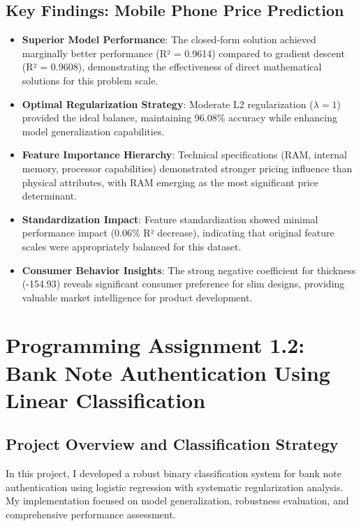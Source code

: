 \documentclass[12pt,a4paper]{article}
\begin{document}
\subsection{Key Findings: Mobile Phone Price Prediction}
\begin{itemize}
\item \textbf{Superior Model Performance}: The closed-form solution achieved marginally better performance (R² = 0.9614) compared to gradient descent (R² = 0.9608), demonstrating the effectiveness of direct mathematical solutions for this problem scale.

\item \textbf{Optimal Regularization Strategy}: Moderate L2 regularization ($\lambda=1$) provided the ideal balance, maintaining 96.08\% accuracy while enhancing model generalization capabilities.

\item \textbf{Feature Importance Hierarchy}: Technical specifications (RAM, internal memory, processor capabilities) demonstrated stronger pricing influence than physical attributes, with RAM emerging as the most significant price determinant.

\item \textbf{Standardization Impact}: Feature standardization showed minimal performance impact (0.06\% R² decrease), indicating that original feature scales were appropriately balanced for this dataset.

\item \textbf{Consumer Behavior Insights}: The strong negative coefficient for thickness (-154.93) reveals significant consumer preference for slim designs, providing valuable market intelligence for product development.
\end{itemize}

\newpage

\section{Programming Assignment 1.2: Bank Note Authentication Using Linear Classification}

\subsection{Project Overview and Classification Strategy}
In this project, I developed a robust binary classification system for bank note authentication using logistic regression with systematic regularization analysis. My implementation focused on model generalization, robustness evaluation, and comprehensive performance assessment.
\end{document}
